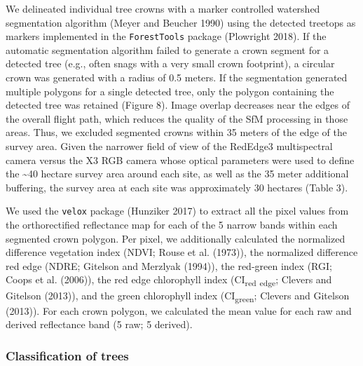 \documentclass[]{article}
\begin{document}
We delineated individual tree crowns with a marker controlled watershed
segmentation algorithm (Meyer and Beucher 1990) using the detected
treetops as markers implemented in the \texttt{ForestTools} package
(Plowright 2018). If the automatic segmentation algorithm failed to
generate a crown segment for a detected tree (e.g., often snags with a
very small crown footprint), a circular crown was generated with a
radius of 0.5 meters. If the segmentation generated multiple polygons
for a single detected tree, only the polygon containing the detected
tree was retained (Figure 8). Image overlap decreases near the edges of
the overall flight path, which reduces the quality of the SfM processing
in those areas. Thus, we excluded segmented crowns within 35 meters of
the edge of the survey area. Given the narrower field of view of the
RedEdge3 multispectral camera versus the X3 RGB camera whose optical
parameters were used to define the \textasciitilde{}40 hectare survey
area around each site, as well as the 35 meter additional buffering, the
survey area at each site was approximately 30 hectares (Table 3).

We used the \texttt{velox} package (Hunziker 2017) to extract all the
pixel values from the orthorectified reflectance map for each of the 5
narrow bands within each segmented crown polygon. Per pixel, we
additionally calculated the normalized difference vegetation index
(NDVI; Rouse et al. (1973)), the normalized difference red edge (NDRE;
Gitelson and Merzlyak (1994)), the red-green index (RGI; Coops et al.
(2006)), the red edge chlorophyll index (CI\textsubscript{red}
\textsubscript{edge}; Clevers and Gitelson (2013)), and the green
chlorophyll index (CI\textsubscript{green}; Clevers and Gitelson
(2013)). For each crown polygon, we calculated the mean value for each
raw and derived reflectance band (5 raw; 5 derived).

\subsubsection{Classification of trees}\label{classification-of-trees}
\end{document}
